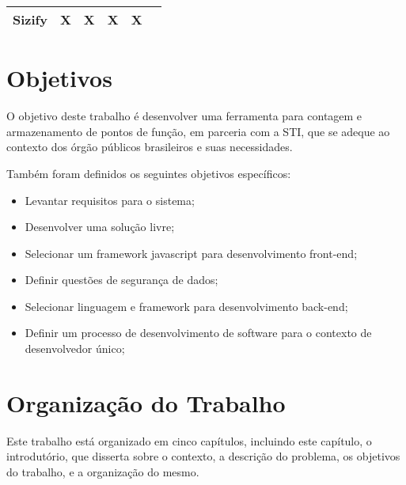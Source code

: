 \begin{table}[ht]
{\begin{tabular}{|l|c|c|c|c|c|}
\textbf{Sizify}                                                              & X                                           & X                                  & X                                                 & X                                                     &                                              \\ \hline
\end{tabular}
}
\end{table}

\section{Objetivos}

O objetivo deste  trabalho é desenvolver uma ferramenta para contagem e
armazenamento de pontos de função, em parceria com a STI, que se adeque ao
contexto dos órgão públicos brasileiros e suas necessidades.

Também foram definidos os seguintes objetivos específicos:

\begin{itemize}

  \item Levantar requisitos para o sistema;

  \item Desenvolver uma solução livre;

  \item Selecionar um framework javascript para desenvolvimento front-end;

  \item  Definir questões de segurança de dados;

  \item Selecionar linguagem e framework para desenvolvimento back-end;

  \item Definir um processo de desenvolvimento de software para o contexto de
  desenvolvedor único;

\end{itemize}


\section{Organização do Trabalho}

Este trabalho está organizado em cinco capítulos, incluindo este capítulo, o
introdutório, que disserta sobre o contexto, a descrição do problema, os
objetivos do trabalho, e a organização do mesmo.

